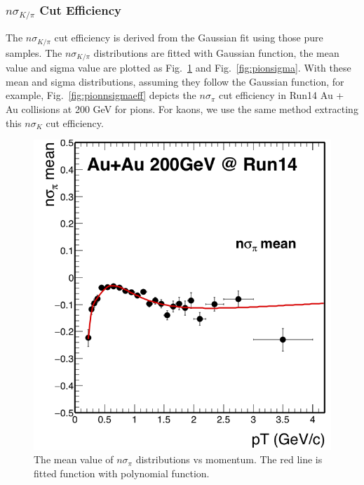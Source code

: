 \documentclass[a4paper]{article}
\begin{document}
\subsubsection{$n\sigma_{K/\pi}$ Cut Efficiency}

The $n\sigma_{K/\pi}$ cut efficiency is derived from the Gaussian fit using those pure samples. The $n\sigma_{K/\pi}$ distributions are fitted with Gaussian function, the mean value and sigma value are plotted as Fig.~\ref{fig:pionmean} and Fig.~\ref{fig:pionsigma}. With these mean and sigma distributions, assuming they follow the Gaussian function, for example, Fig.~\ref{fig:pionnsigmaeff} depicts the $n\sigma_{\pi}$ cut efficiency in Run14 Au + Au collisions at 200 GeV for pions. For kaons, we use the same method extracting this $n\sigma_{K}$ cut efficiency.

\begin{figure}[htbp]
\begin{minipage}[htbp]{0.5\linewidth}
\centering
\includegraphics[width=1.0\textwidth]{fig/nSigPion_mean.png}
\caption{The mean value of $n\sigma_{\pi}$ distributions vs momentum. The red line is fitted function with polynomial function. \label{fig:pionmean}}
\end{minipage}
\hfill
\begin{minipage}[htbp]{0.5\linewidth}

\end{minipage}
\end{figure}
\end{document}
